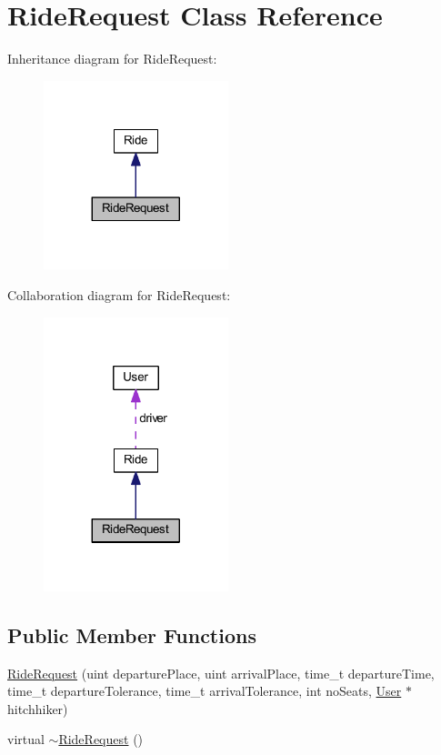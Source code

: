 \hypertarget{class_ride_request}{}\section{Ride\+Request Class Reference}
\label{class_ride_request}


Inheritance diagram for Ride\+Request\+:\nopagebreak
\begin{figure}[H]
\begin{center}
\leavevmode
\includegraphics[width=152pt]{class_ride_request__inherit__graph}
\end{center}
\end{figure}


Collaboration diagram for Ride\+Request\+:\nopagebreak
\begin{figure}[H]
\begin{center}
\leavevmode
\includegraphics[width=152pt]{class_ride_request__coll__graph}
\end{center}
\end{figure}
\subsection*{Public Member Functions}
\begin{DoxyCompactItemize}
\item 
\hyperlink{class_ride_request_a58874aa113243ac8e5e6a2bf68a96037}{Ride\+Request} (uint departure\+Place, uint arrival\+Place, time\+\_\+t departure\+Time, time\+\_\+t departure\+Tolerance, time\+\_\+t arrival\+Tolerance, int no\+Seats, \hyperlink{class_user}{User} $\ast$hitchhiker)
\item 
virtual \hyperlink{class_ride_request_a0c37241ff14f6c423ca576159e3d8b19}{$\sim$\+Ride\+Request} ()
\end{DoxyCompactItemize}
